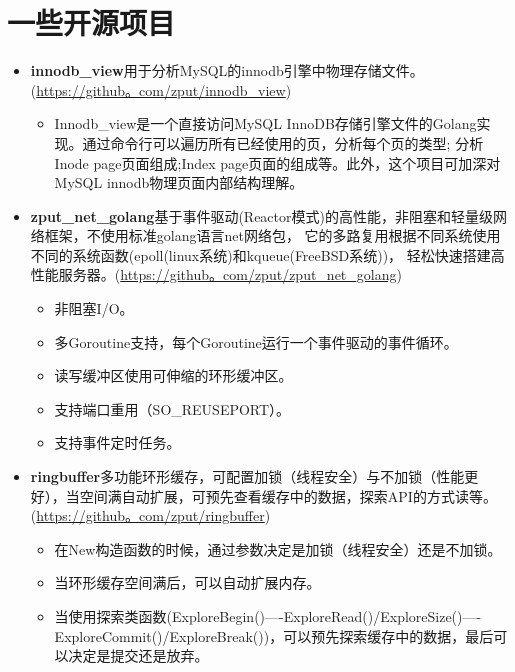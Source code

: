 \documentclass{resume}
\begin{document}
\section{一些开源项目}
\begin{itemize}[parsep=0。2ex]
  \item \textbf{innodb\_view}用于分析MySQL的innodb引擎中物理存储文件。(\url{https://github。com/zput/innodb\_view})
    \begin{itemize}[parsep=0。2ex]
        \item Innodb_view是一个直接访问MySQL InnoDB存储引擎文件的Golang实现。通过命令行可以遍历所有已经使用的页，分析每个页的类型; 分析Inode page页面组成;Index page页面的组成等。此外，这个项目可加深对MySQL innodb物理页面内部结构理解。
    \end{itemize}

  \item \textbf{zput\_net\_golang}基于事件驱动(Reactor模式)的高性能，非阻塞和轻量级网络框架，不使用标准golang语言net网络包， 它的多路复用根据不同系统使用不同的系统函数(epoll(linux系统)和kqueue(FreeBSD系统))， 轻松快速搭建高性能服务器。(\url{https://github。com/zput/zput\_net\_golang})
    \begin{itemize}[parsep=0。2ex]
          \item 非阻塞I/O。
          \item 多Goroutine支持，每个Goroutine运行一个事件驱动的事件循环。
          \item 读写缓冲区使用可伸缩的环形缓冲区。
          \item 支持端口重用（SO\_REUSEPORT）。
          \item 支持事件定时任务。
    \end{itemize}

  \item \textbf{ringbuffer}多功能环形缓存，可配置加锁（线程安全）与不加锁（性能更好），当空间满自动扩展，可预先查看缓存中的数据，探索API的方式读等。(\url{https://github。com/zput/ringbuffer})
    \begin{itemize}[parsep=0。2ex]
          \item 在New构造函数的时候，通过参数决定是加锁（线程安全）还是不加锁。
          \item 当环形缓存空间满后，可以自动扩展内存。
          \item 当使用探索类函数(ExploreBegin()----ExploreRead()/ExploreSize()----ExploreCommit()/ExploreBreak())，可以预先探索缓存中的数据，最后可以决定是提交还是放弃。
    \end{itemize}


\end{itemize}
\end{document}
